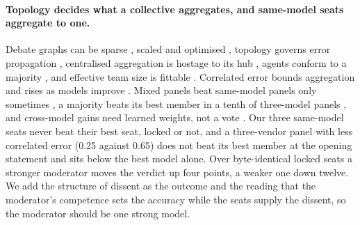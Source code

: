 \paragraph{Topology decides what a collective aggregates, and same-model seats aggregate to one.}
Debate graphs can be sparse \citep{li2024sparse}, scaled and optimised
\citep{qian2025macnet,zhuge2024gptswarm,liu2024dylan}, topology governs error
propagation \citep{shen2025propagation}, centralised aggregation is hostage to
its hub \citep{han2026conformity}, agents conform to a majority
\citep{zhang2024socialpsych,weng2025conformity,bertalanic2026costconsensus},
and effective team size is fittable \citep{bertalanic2026ringelmann}.
Correlated error bounds aggregation and rises as models improve
\citep{kim2025correlated,goel2025alike}. Mixed panels beat same-model panels
only sometimes \citep{wang2025moa,li2025rethinking}, a majority beats its best
member in a tenth of three-model panels \citep{kim2026diversity}, and
cross-model gains need learned weights, not a vote \citep{douven2026wisdom}.
Our three same-model seats never beat their best seat, locked or not, and a
three-vendor panel with less correlated error (0.25 against 0.65) does not
beat its best member at the opening statement and sits below the best model
alone. Over byte-identical locked seats a stronger moderator moves the verdict
up four points, a weaker one down twelve. We add the structure of dissent as
the outcome and the reading that the moderator's competence sets the accuracy
while the seats supply the dissent, so the moderator should be one strong
model.

